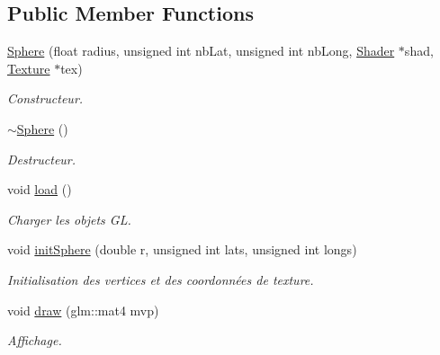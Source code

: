 \subsection*{Public Member Functions}
\begin{DoxyCompactItemize}
\item 
\hypertarget{classSphere_a9966f217c4fd4e67f8aac6bac69001dd}{\hyperlink{classSphere_a9966f217c4fd4e67f8aac6bac69001dd}{Sphere} (float radius, unsigned int nb\+Lat, unsigned int nb\+Long, \hyperlink{classShader}{Shader} $\ast$shad, \hyperlink{classTexture}{Texture} $\ast$tex)}\label{classSphere_a9966f217c4fd4e67f8aac6bac69001dd}

\begin{DoxyCompactList}\small\item\em Constructeur. \end{DoxyCompactList}\item 
\hypertarget{classSphere_a569c071e50a3e11f678630ee1a17737e}{\hyperlink{classSphere_a569c071e50a3e11f678630ee1a17737e}{$\sim$\+Sphere} ()}\label{classSphere_a569c071e50a3e11f678630ee1a17737e}

\begin{DoxyCompactList}\small\item\em Destructeur. \end{DoxyCompactList}\item 
\hypertarget{classSphere_a9ae197a2b240049447bb0405a5916072}{void \hyperlink{classSphere_a9ae197a2b240049447bb0405a5916072}{load} ()}\label{classSphere_a9ae197a2b240049447bb0405a5916072}

\begin{DoxyCompactList}\small\item\em Charger les objets G\+L. \end{DoxyCompactList}\item 
\hypertarget{classSphere_a25ad89145b9d03ffb97ef88d4b9598e8}{void \hyperlink{classSphere_a25ad89145b9d03ffb97ef88d4b9598e8}{init\+Sphere} (double r, unsigned int lats, unsigned int longs)}\label{classSphere_a25ad89145b9d03ffb97ef88d4b9598e8}

\begin{DoxyCompactList}\small\item\em Initialisation des vertices et des coordonnées de texture. \end{DoxyCompactList}\item 
\hypertarget{classSphere_a1fea410bb099ab2b60707ed71186c17c}{void \hyperlink{classSphere_a1fea410bb099ab2b60707ed71186c17c}{draw} (glm\+::mat4 mvp)}\label{classSphere_a1fea410bb099ab2b60707ed71186c17c}

\begin{DoxyCompactList}\small\item\em Affichage. \end{DoxyCompactList}\end{DoxyCompactItemize}
